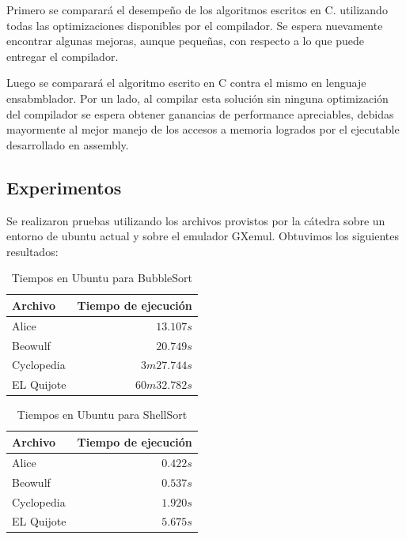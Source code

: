 \documentclass[a4paper,11pt]{article}
\begin{document}
Primero se comparará el desempeño de los algoritmos escritos en C. utilizando todas las optimizaciones disponibles por el
compilador. Se espera nuevamente encontrar algunas mejoras, aunque pequeñas,
con respecto a lo que puede entregar el compilador.

Luego se comparará el algoritmo escrito en C contra el mismo en lenguaje ensabmblador.
Por un lado, al compilar esta solución sin ninguna optimización del compilador 
se espera obtener ganancias de performance apreciables, debidas mayormente al 
mejor manejo de los accesos a memoria logrados por el ejecutable desarrollado en assembly.

\subsection{Experimentos}

Se realizaron pruebas utilizando los archivos provistos por la cátedra sobre un entorno de ubuntu actual y sobre el emulador GXemul.
Obtuvimos los siguientes resultados:

\begin{table}[h!t]
\centering
\begin{tabular}{ | l | r | }
  \hline
  Archivo          & Tiempo de ejecución \\ \hline
  Alice				 & \(13.107s\) \\
  Beowulf     & \(20.749s\) \\
  Cyclopedia     & \(3m 27.744s\) \\
  EL Quijote      & \(60m 32.782s\) \\
  \hline
\end{tabular}
\caption{Tiempos en Ubuntu para BubbleSort}
\label{tab:resultados}
\end{table}

\FloatBarrier

\begin{table}[h!t]
\centering
\begin{tabular}{ | l | r | }
  \hline
  Archivo          & Tiempo de ejecución \\ \hline
  Alice				 & \(0.422s\) \\
  Beowulf     & \(0.537s\) \\
  Cyclopedia     & \(1.920s\) \\
  EL Quijote      & \(5.675s\) \\
  \hline
\end{tabular}
\caption{Tiempos en Ubuntu para ShellSort}
\label{tab:resultados}
\end{table}
\end{document}
